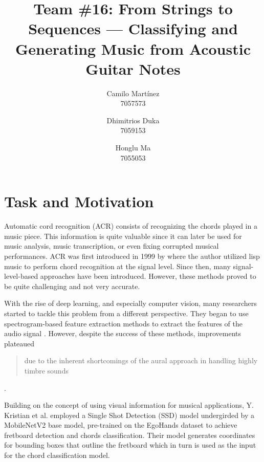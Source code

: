 \documentclass[10pt,twocolumn,letterpaper]{article}
\begin{document}
\title{Team \#16: From Strings to Sequences --- Classifying and Generating Music from Acoustic Guitar Notes}

\author{
 Camilo Martínez\\
 7057573\\
    \and
 Dhimitrios Duka\\
 7059153\\
    \and
 Honglu Ma\\
 7055053\\
}
\maketitle

\section{Task and Motivation}
Automatic cord recognition (ACR) consists of recognizing the chords played in a music piece. This information is quite valuable since it can later be used for music analysis, music transcription, or even fixing corrupted musical performances. ACR was first introduced in 1999 by \cite{takuya1999realtime} where the author utilized lisp music to perform chord recognition at the signal level. Since then, many signal-level-based approaches have been introduced. However, these methods proved to be quite challenging and not very accurate.

With the rise of deep learning, and especially computer vision, many researchers started to tackle this problem from a different perspective. They began to use spectrogram-based feature extraction methods to extract the features of the audio signal \cite{boulanger2013audio, korzeniowski2016feature, stark2009real}. However, despite the success of these methods, improvements plateaued \blockquote{due to the inherent shortcomings of the aural approach in handling highly timbre sounds} \cite{du2023conditional}.


Building on the concept of using visual information for musical applications, Y. Kristian et al. \cite{Kristian_Zaman_Tenoyo_Jodhinata_2024} employed a Single Shot Detection (SSD) model undergirded by a MobileNetV2 \cite{sandler2018mobilenetv2} base model, pre-trained on the EgoHands \cite{Bambach_2015_ICCV} dataset to achieve fretboard detection and chords classification. Their model generates coordinates for bounding boxes that outline the fretboard which in turn is used as the input for the chord classification model.
\end{document}
